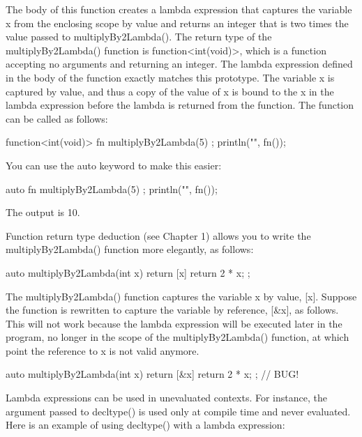 The body of this function creates a lambda expression that captures the variable x from the enclosing scope by value and returns an integer that is two times the value passed to multiplyBy2Lambda(). The return type of the multiplyBy2Lambda() function is function<int(void)>, which is a function accepting no arguments and returning an integer. The lambda expression defined in the body of the function exactly matches this prototype. The variable x is captured by value, and thus a copy of the value of x is bound to the x in the lambda expression before the lambda is returned from the function. The function can be called as follows:

\begin{cpp}
function<int(void)> fn { multiplyBy2Lambda(5) };
println("{}", fn());
\end{cpp}

You can use the auto keyword to make this easier:

\begin{cpp}
auto fn { multiplyBy2Lambda(5) };
println("{}", fn());
\end{cpp}

The output is 10.

Function return type deduction (see Chapter 1) allows you to write the multiplyBy2Lambda() function more elegantly, as follows:

\begin{cpp}
auto multiplyBy2Lambda(int x)
{
    return [x]{ return 2 * x; };
}
\end{cpp}

The multiplyBy2Lambda() function captures the variable x by value, [x]. Suppose the function is rewritten to capture the variable by reference, [\&x], as follows. This will not work because the lambda expression will be executed later in the program, no longer in the scope of the multiplyBy2Lambda() function, at which point the reference to x is not valid anymore.

\begin{cpp}
auto multiplyBy2Lambda(int x)
{
    return [&x]{ return 2 * x; }; // BUG!
}
\end{cpp}


Lambda expressions can be used in unevaluated contexts. For instance, the argument passed to decltype() is used only at compile time and never evaluated. Here is an example of using decltype() with a lambda expression:

